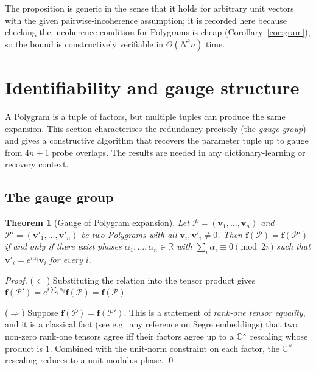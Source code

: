 \documentclass[11pt,letterpaper]{article}
\newtheorem{theorem}{Theorem}[section]
\theoremstyle{definition}
\newcommand{\C}{\mathbb{C}}
\newcommand{\R}{\mathbb{R}}
\newcommand{\Polygram}{\mathcal{P}}
\begin{document}
The proposition is generic in the sense that it holds for arbitrary unit
vectors with the given pairwise-incoherence assumption; it is recorded here
because checking the incoherence condition for Polygrams is cheap
(Corollary~\ref{cor:gram}), so the bound is constructively verifiable in
$\Theta(N^{2} n)$ time.

\section{Identifiability and gauge structure}
\label{sec:identifiability}

A Polygram is a tuple of factors, but multiple tuples can produce the same
expansion. This section characterises the redundancy precisely (the
\emph{gauge group}) and gives a constructive algorithm that recovers the
parameter tuple up to gauge from $4n + 1$ probe overlaps. The results are
needed in any dictionary-learning or recovery context.

\subsection{The gauge group}

\begin{theorem}[Gauge of Polygram expansion]
\label{thm:gauge}
Let $\Polygram = (\bm{v}_{1}, \dots, \bm{v}_{n})$ and $\Polygram' = (\bm{v}'_{1},
\dots, \bm{v}'_{n})$ be two Polygrams with all $\bm{v}_{i}, \bm{v}'_{i}
\neq 0$. Then $\bm{f}(\Polygram) = \bm{f}(\Polygram')$ if and only if there
exist phases $\alpha_{1}, \dots, \alpha_{n} \in \R$ with $\sum_{i}
\alpha_{i} \equiv 0 \pmod{2\pi}$ such that $\bm{v}'_{i} = e^{i\alpha_{i}}
\bm{v}_{i}$ for every $i$.
\end{theorem}
\begin{proof}
($\Leftarrow$) Substituting the relation into the tensor product gives
$\bm{f}(\Polygram') = e^{i \sum_{i} \alpha_{i}} \bm{f}(\Polygram) =
\bm{f}(\Polygram)$.

($\Rightarrow$) Suppose $\bm{f}(\Polygram) = \bm{f}(\Polygram')$. This is a
statement of \emph{rank-one tensor equality}, and it is a classical fact
(see e.g.\ any reference on Segre embeddings) that two non-zero rank-one
tensors agree iff their factors agree up to a $\C^{\times}$ rescaling whose
product is $1$. Combined with the unit-norm constraint on each factor, the
$\C^{\times}$ rescaling reduces to a unit modulus phase. \qed
\end{proof}
\end{document}
